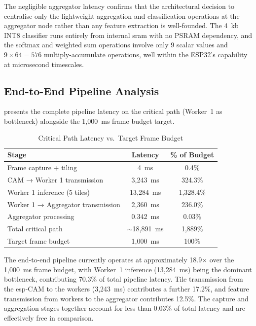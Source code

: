 The negligible aggregator latency confirms that the architectural decision to centralise
only the lightweight aggregation and classification operations at the aggregator node
rather than any feature extraction is well-founded. The 4~\gls{kb} INT8 classifier
runs entirely from internal \gls{sram} with no PSRAM dependency, and the softmax
and weighted sum operations involve only 9 scalar values and $9 \times 64 = 576$
multiply-accumulate operations, well within the ESP32's capability at microsecond
timescales.
 
\subsection{End-to-End Pipeline Analysis}
 
 presents the complete pipeline latency on the critical path
(Worker~1 as bottleneck) alongside the 1,000~ms frame budget target.
 
\begin{table}[H]
\renewcommand{\arraystretch}{1.25}
\caption{Critical Path Latency vs.\ Target Frame Budget}
\label{tab:critical_path}
\centering
\begin{tabular}{lcc}
\toprule
\textbf{Stage}                        & \textbf{Latency}  & \textbf{\% of Budget} \\
\midrule
Frame capture + tiling                & 4~ms              & 0.4\%                 \\
CAM → Worker 1 transmission           & 3,243~ms          & 324.3\%               \\
Worker 1 inference (5 tiles)          & 13,284~ms         & 1,328.4\%             \\
Worker 1 → Aggregator transmission    & 2,360~ms          & 236.0\%               \\
Aggregator processing                 & 0.342~ms          & 0.03\%                \\
\midrule
Total critical path                   & $\sim$18,891~ms   & 1,889\%               \\
Target frame budget                   & 1,000~ms          & 100\%                 \\
\bottomrule
\end{tabular}
\end{table}
 
The end-to-end pipeline currently operates at approximately 18.9$\times$ over the
1,000~ms frame budget, with Worker~1 inference (13,284~ms) being the dominant
bottleneck, contributing 70.3\% of total pipeline latency. Tile transmission from the
\gls{esp}-CAM to the workers (3,243~ms) contributes a further 17.2\%, and feature
transmission from workers to the aggregator contributes 12.5\%. The capture and
aggregation stages together account for less than 0.03\% of total latency and are
effectively free in comparison.
 
